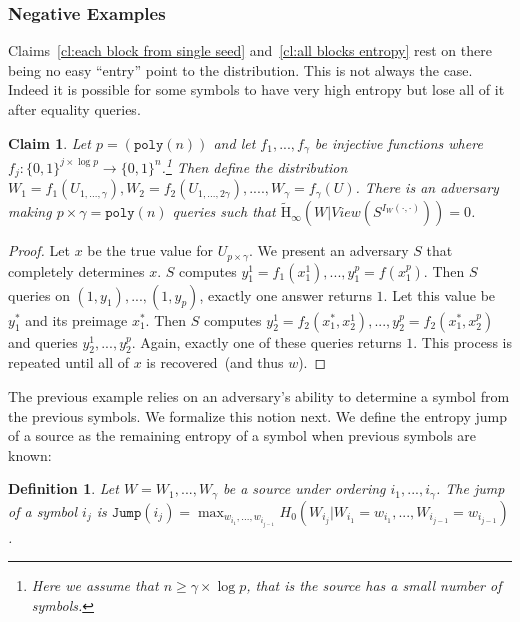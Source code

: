 \documentclass[11pt]{article}
\newtheorem{definition}[theorem]{Definition}
\newtheorem{claim}[theorem]{Claim}
\newcommand{\zo}{\ensuremath{\{0, 1\}}}
\newcommand{\poly}{\ensuremath{\mathtt{poly}}\xspace}
\newcommand{\Hav}{\tilde{\mathrm{H}}_\infty}
\begin{document}
\subsubsection{Negative Examples}
\label{sec:negative ex}
Claims~\ref{cl:each block from single seed} and~\ref{cl:all blocks entropy} rest on there being no easy ``entry'' point to the distribution.  This is not always the case.  Indeed it is possible for some symbols to have very high entropy but lose all of it after equality queries.

\begin{claim}
Let $p = (\poly(n))$ and let $f_1,..., f_{\gamma}$ be injective functions where $f_j:\zo^{j\times \log p}\rightarrow \zo^n$.\footnote{Here we assume that $n\ge \gamma \times \log p$, that is the source has a small number of symbols.}  Then define the distribution $W_1 = f_1(U_{1,...,\gamma}), W_2 = f_2(U_{1,..., 2\gamma}),...., W_\gamma = f_\gamma(U)$.  There is an adversary making $p\times \gamma = \poly(n)$ queries such that $\Hav(W | View(S^{I_W(\cdot, \cdot)})) = 0$.
\end{claim}
\begin{proof}
Let $x$ be the true value for $U_{p\times \gamma}$.
We present an adversary $S$ that completely determines $x$.  $S$ computes $y_1^1 = f_1(x_1^1),..., y_1^p = f(x_1^p)$.  Then $S$ queries on $(1, y_1),..., (1, y_p)$, exactly one answer returns $1$.  Let this value be $y_1^*$ and its preimage $x_1^*$.  Then $S$ computes $y_2^1 = f_2(x_1^*,x_2^1), ..., y_2^p= f_2(x_1^*, x_2^p)$ and queries $y_2^1,..., y_2^p$.  Again, exactly one of these queries returns $1$.  This process is repeated until all of $x$ is recovered~(and thus $w$).  %
\end{proof}

The previous example relies on an adversary's ability to determine a symbol from the previous symbols.  We formalize this notion next.  We define the entropy jump of a source as the remaining entropy of a symbol when previous symbols are known:

\begin{definition}
Let $W = W_1,..., W_\gamma$ be a source under ordering $i_1,..., i_\gamma$.  The \emph{jump} of a symbol $i_j$ is $\mathtt{Jump}(i_j) = \max_{w_{i_1},..., w_{i_{j-1}}} H_0 (W_{i_j} | W_{i_1} = w_{i_1} ,..., W_{i_{j-1}} = w_{i_{j-1}})$.
\end{definition}
\end{document}
